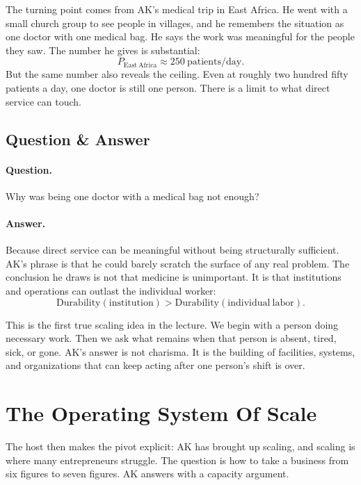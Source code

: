 The turning point comes from AK's medical trip in East Africa. He went with a small church group to see people in villages, and he remembers the situation as one doctor with one medical bag. He says the work was meaningful for the people they saw. The number he gives is substantial:
\begin{equation}
P_{\mathrm{East\ Africa}} \approx 250 \ \mathrm{patients/day}.
\end{equation}
But the same number also reveals the ceiling. Even at roughly two hundred fifty patients a day, one doctor is still one person. There is a limit to what direct service can touch.

\subsection{Question \& Answer}

\paragraph{Question.}
Why was being one doctor with a medical bag not enough?

\paragraph{Answer.}
Because direct service can be meaningful without being structurally sufficient. AK's phrase is that he could barely scratch the surface of any real problem. The conclusion he draws is not that medicine is unimportant. It is that institutions and operations can outlast the individual worker:
\begin{equation}
\mathrm{Durability}(\mathrm{institution})
>
\mathrm{Durability}(\mathrm{individual\ labor}).
\end{equation}

This is the first true scaling idea in the lecture. We begin with a person doing necessary work. Then we ask what remains when that person is absent, tired, sick, or gone. AK's answer is not charisma. It is the building of facilities, systems, and organizations that can keep acting after one person's shift is over.

\section{The Operating System Of Scale}

The host then makes the pivot explicit: AK has brought up scaling, and scaling is where many entrepreneurs struggle. The question is how to take a business from six figures to seven figures. AK answers with a capacity argument.

